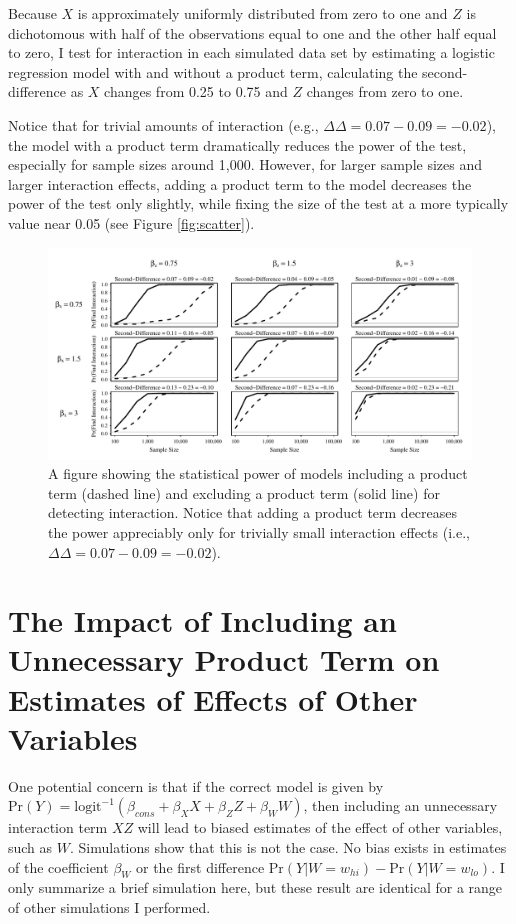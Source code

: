 \documentclass[12pt]{article}
\begin{document}
\begin{appendix}
Because $X$ is approximately uniformly distributed from zero to one and $Z$ is dichotomous with half of the observations equal to one and the other half equal to zero, I test for interaction in each simulated data set by estimating a logistic regression model with and without a product term, calculating the second-difference as $X$ changes from 0.25 to 0.75 and $Z$ changes from zero to one. 

Notice that for trivial amounts of interaction (e.g., $\Delta\Delta = 0.07-0.09 = -0.02$), the model with a product term dramatically reduces the power of the test, especially for sample sizes around 1,000. However, for larger sample sizes and larger interaction effects, adding a product term to the model decreases the power of the test only slightly, while fixing the size of the test at a more typically value near 0.05 (see Figure \ref{fig:scatter}).

\begin{figure}[H]
\begin{center}
\includegraphics[scale = .8]{fig/fig-pwr.pdf}
\end{center}\caption{A figure showing the statistical power of models including a product term (dashed line) and excluding a product term (solid line) for detecting interaction. Notice that adding a product term decreases the power appreciably only for trivially small interaction effects (i.e., $\Delta\Delta = 0.07-0.09 = -0.02$).}\label{fig:pwr}
\end{figure}

\section{The Impact of Including an Unnecessary Product Term on Estimates of Effects of Other Variables}

One potential concern is that if the correct model is given by $\text{Pr}(Y) = \text{logit}^{-1}(\beta_{cons} + \beta_XX + \beta_ZZ + \beta_{W}W)$, then including an unnecessary interaction term $XZ$ will lead to biased estimates of the effect of other variables, such as $W$. Simulations show that this is not the case. No bias exists in estimates of the coefficient $\beta_W$ or the first difference $\text{Pr}(Y | W = w_{hi}) - \text{Pr}(Y | W = w_{lo})$. I only summarize a brief simulation here, but these result are identical for a range of other simulations I performed.


\end{appendix}
\end{document}
